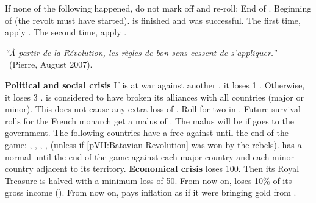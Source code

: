 \condition{}
\aparag If none of the following happened, do not mark off and re-roll:
\bparag End of .
\bparag Beginning of  (the revolt must have
started).
\bparag {} is finished and was successful.
\aparag The first time, apply . The second
time, apply .
\begin{designnote}
  \textit{``\`{A} partir de la R\'{e}volution, les r\`{e}gles de bon sens
    cessent de s'appliquer.''}\\
  ~\hfill (Pierre, August 2007).
\end{designnote}



\phevnt
\aparag \textbf{Political and social crisis}
\bparag If \FRA is at war against another \MAJ, it loses 1 \STAB. Otherwise,
it loses 3 \STAB.
\bparag \FRA is considered to have broken its alliances with all countries
(major or minor). This does not cause any extra loss of \STAB.
\bparag Roll for two \REVOLT in \paysmajeurFrance.
\bparag Future survival rolls for the French monarch get a malus of
. The malus will be  if \FRA goes to the
\monarqueConvention government.
\bparag The following countries have a free \CB against \FRA until the end of
the game: \ENG, \AUS, \PRU, \HIS, \HOL (unless if \ref{pVII:Batavian
  Revolution} was won by the rebels).
\bparag \FRA has a normal \CB until the end of the game against each major
country and each minor country adjacent to its territory.
\aparag \textbf{Economical crisis}
\bparag \FRA loses 100\ducats. Then its Royal Treasure is halved %
with a minimum loss of 50\ducats.
\bparag From now on, \FRA loses 10\% of its gross income
().
\bparag From now on, \FRA pays inflation as if it were bringing gold from
\continentAmerica.

